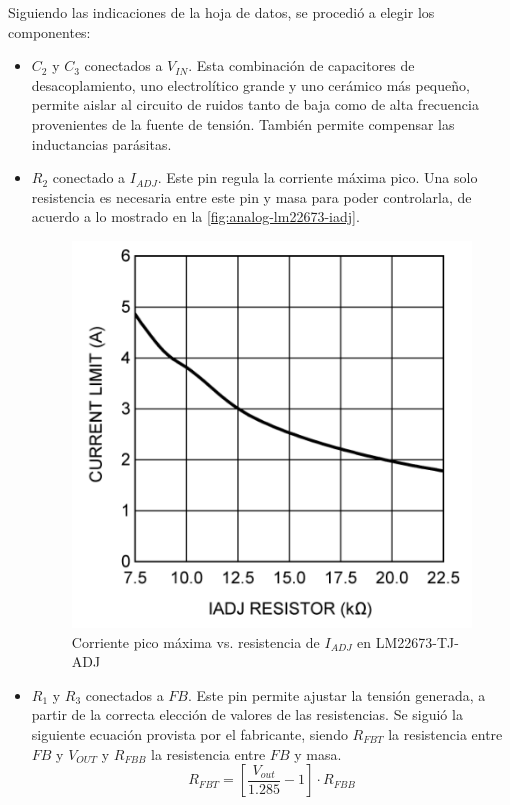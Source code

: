\documentclass[../et.tex]{subfiles}
\begin{document}
  Siguiendo las indicaciones de la hoja de datos, se procedió a elegir los componentes:

  \begin{itemize}
    \item $C_2$ y $C_3$ conectados a $V_{IN}$. Esta combinación de capacitores de desacoplamiento, uno electrolítico grande y uno cerámico más pequeño, permite aislar al circuito de ruidos tanto de baja como de alta frecuencia provenientes de la fuente de tensión. También permite compensar las inductancias parásitas.
    \item $R_2$ conectado a $I_{ADJ}$. Este pin regula la corriente máxima pico. Una solo resistencia es necesaria entre este pin y masa para poder controlarla, de acuerdo a lo mostrado en la \autoref{fig:analog-lm22673-iadj}.

    \begin{figure}[!htbp]
      \centering
      \includegraphics[scale=0.6]{../images/analog-lm22673-iadj.png}
      \caption{Corriente pico máxima vs. resistencia de $I_{ADJ}$ en LM22673-TJ-ADJ}
      \label{fig:analog-lm22673-iadj}
    \end{figure}

    \item $R_1$ y $R_3$ conectados a $FB$. Este pin permite ajustar la tensión generada, a partir de la correcta elección de valores de las resistencias. Se siguió la siguiente ecuación provista por el fabricante, siendo $R_{FBT}$ la resistencia entre $FB$ y $V_{OUT}$ y $R_{FBB}$ la resistencia entre $FB$ y masa.
      \[
        R_{FBT} = \left[ \frac{V_{out}}{1.285} - 1 \right] \cdot R_{FBB}
      \]


\end{itemize}
\end{document}
